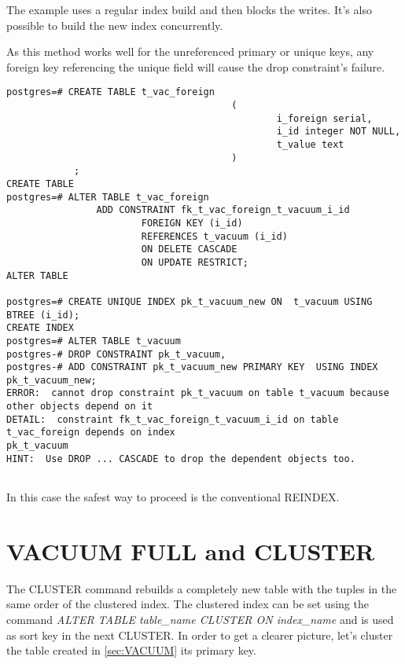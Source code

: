 The example uses a regular index build and then blocks the writes. It's also possible to 
build the new index concurrently.

As this method works well for the unreferenced primary or unique keys, any foreign key 
referencing the unique field will cause the drop constraint's failure.

\begin{lstlisting}[style=pgsql]
 postgres=# CREATE TABLE t_vac_foreign
                                        (
                                                i_foreign serial,
                                                i_id integer NOT NULL,
                                                t_value text
                                        )
            ;
CREATE TABLE
postgres=# ALTER TABLE t_vac_foreign 
                ADD CONSTRAINT fk_t_vac_foreign_t_vacuum_i_id
                        FOREIGN KEY (i_id) 
                        REFERENCES t_vacuum (i_id) 
                        ON DELETE CASCADE 
                        ON UPDATE RESTRICT;
ALTER TABLE

postgres=# CREATE UNIQUE INDEX pk_t_vacuum_new ON  t_vacuum USING BTREE (i_id);
CREATE INDEX
postgres=# ALTER TABLE t_vacuum
postgres-# DROP CONSTRAINT pk_t_vacuum,
postgres-# ADD CONSTRAINT pk_t_vacuum_new PRIMARY KEY  USING INDEX pk_t_vacuum_new;
ERROR:  cannot drop constraint pk_t_vacuum on table t_vacuum because other objects depend on it
DETAIL:  constraint fk_t_vac_foreign_t_vacuum_i_id on table t_vac_foreign depends on index 
pk_t_vacuum
HINT:  Use DROP ... CASCADE to drop the dependent objects too.


\end{lstlisting}

In this case the safest way to proceed is the conventional REINDEX. 

\begin{comment}


\end{comment}


\section{VACUUM FULL and CLUSTER}
\label{sec:VACFULL}
The CLUSTER command rebuilds a completely new table with the tuples in the same order of the 
clustered index. The clustered index can be set using the command \textit{ALTER TABLE table\_name 
CLUSTER ON index\_name} and is used as sort key in the next CLUSTER. 
In order to get a clearer picture, let's cluster the table created in \ref{sec:VACUUM} its
primary key. 

